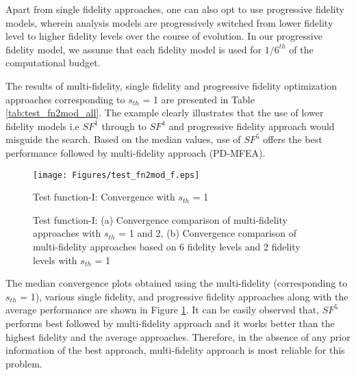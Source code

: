 Apart from single fidelity approaches, one can also opt to use progressive fidelity models, wherein analysis models are progressively switched from lower fidelity level to higher fidelity levels over the course of evolution. In our progressive fidelity model, we assume that each fidelity model is used for $1/6^{th}$ of the computational budget.

The results of multi-fidelity, single fidelity and progressive fidelity optimization approaches corresponding to $s_{th}$ = 1  are presented in Table \ref{tab:test_fn2mod_all}. The example clearly illustrates that the use of lower fidelity models i.e $SF^1$ through to $SF^4$ and progressive fidelity approach would misguide the search. Based on the median values, use of $SF^5$ offers the best performance followed by multi-fidelity approach (PD-MFEA). 

\begin{figure}[ht]
	\centering
	\texttt{[image: Figures/test\_fn2mod\_f.eps]}
	\caption{Test function-I: Convergence with $s_{th}$ = 1}
	\label{fig:Meanplot_test_fn2mod_1sigma}
\end{figure}

\begin{figure}[ht]
	\centering
	\caption{Test function-I: (a) Convergence comparison of multi-fidelity approaches with $s_{th}$ = 1 and 2, (b) Convergence comparison of multi-fidelity approaches based on 6 fidelity levels and 2 fidelity levels with $s_{th}$ = 1}
	\label{fig:convergence_numfideval_test_fn2mod}
\end{figure}

The median convergence plots obtained using the multi-fidelity (corresponding to $s_{th}$ = 1), various single fidelity, and progressive fidelity approaches along with the average performance are shown in Figure \ref{fig:Meanplot_test_fn2mod_1sigma}. It can be easily observed that, $SF^5$ performs best followed by multi-fidelity approach and it works better than the highest fidelity and the average approaches. Therefore, in the absence of any prior information of the best approach, multi-fidelity approach is most reliable for this problem. 

